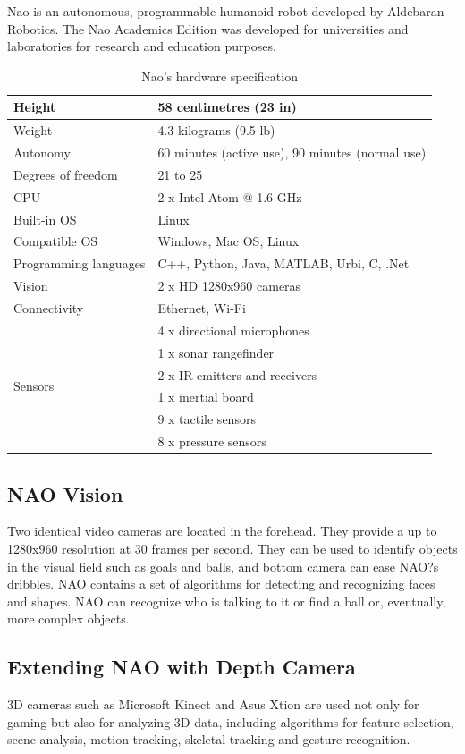 Nao is an autonomous, programmable humanoid robot developed by Aldebaran Robotics. The Nao Academics Edition was developed for universities and laboratories for research and education purposes.
\begin{table}
	[h] \centering \caption{Nao's hardware specification } \label{tb:interf:1} 
	\begin{tabular}
		{|l|l|} \hline Height & 58 centimetres (23 in) \\
		\hline Weight & 4.3 kilograms (9.5 lb) \\
		\hline Autonomy & 60 minutes (active use), 90 minutes (normal use) \\
		\hline Degrees of freedom & 21 to 25 \\
		\hline CPU & 2 x Intel Atom @ 1.6 GHz \\
		\hline Built-in OS & Linux \\
		\hline Compatible OS & Windows, Mac OS, Linux \\
		\hline Programming languages & C++, Python, Java, MATLAB, Urbi, C, .Net \\
		\hline Vision & 2 x HD 1280x960 cameras \\
		\hline Connectivity & Ethernet, Wi-Fi \\
		\hline \multirow{6}{*}{Sensors} & 4 x directional microphones \\
		& 1 x sonar rangefinder \\
		& 2 x IR emitters and receivers \\
		& 1 x inertial board \\
		& 9 x tactile sensors \\
		& 8 x pressure sensors \\
		\hline 
	\end{tabular}
\end{table}

\subsection{NAO Vision} Two identical video cameras are located in the forehead. They provide a up to 1280x960 resolution at 30 frames per second. They can be used to identify objects in the visual field such as goals and balls, and bottom camera can ease NAO?s dribbles. NAO contains a set of algorithms for detecting and recognizing faces and shapes. NAO can recognize who is talking to it or find a ball or, eventually, more complex objects.

\subsection{Extending NAO with Depth Camera} 
3D cameras such as Microsoft Kinect and Asus Xtion are used not only for gaming but also for analyzing 3D data, including algorithms for feature selection, scene analysis, motion tracking, skeletal tracking and gesture recognition. 

